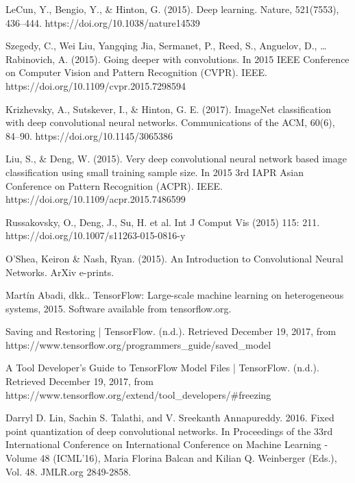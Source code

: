 %
% 

% 
% 
\begin{thebibliography}{4}

{LeCun, Y., Bengio, Y., \& Hinton, G. (2015). Deep learning. Nature, 521(7553), 436–444. https://doi.org/10.1038/nature14539}

{Szegedy, C., Wei Liu, Yangqing Jia, Sermanet, P., Reed, S., Anguelov, D., … Rabinovich, A. (2015). Going deeper with convolutions. In 2015 IEEE Conference on Computer Vision and Pattern Recognition (CVPR). IEEE. https://doi.org/10.1109/cvpr.2015.7298594}

{Krizhevsky, A., Sutskever, I., \& Hinton, G. E. (2017). ImageNet classification with deep convolutional neural networks. Communications of the ACM, 60(6), 84–90. https://doi.org/10.1145/3065386}

{Liu, S., \& Deng, W. (2015). Very deep convolutional neural network based image classification using small training sample size. In 2015 3rd IAPR Asian Conference on Pattern Recognition (ACPR). IEEE. https://doi.org/10.1109/acpr.2015.7486599}

{Russakovsky, O., Deng, J., Su, H. et al. Int J Comput Vis (2015) 115: 211. https://doi.org/10.1007/s11263-015-0816-y}

{O'Shea, Keiron \& Nash, Ryan. (2015). An Introduction to Convolutional Neural Networks. ArXiv e-prints.}

{Martín Abadi, dkk.. TensorFlow: Large-scale machine learning on heterogeneous systems, 2015. Software available from tensorflow.org.}

{Saving and Restoring  |  TensorFlow. (n.d.). Retrieved December 19, 2017, from https://www.tensorflow.org/programmers\_guide/saved\_model}

{A Tool Developer's Guide to TensorFlow Model Files  |  TensorFlow. (n.d.). Retrieved December 19, 2017, from https://www.tensorflow.org/extend/tool\_developers/\#freezing}

{Darryl D. Lin, Sachin S. Talathi, and V. Sreekanth Annapureddy. 2016. Fixed point quantization of deep convolutional networks. In Proceedings of the 33rd International Conference on International Conference on Machine Learning - Volume 48 (ICML'16), Maria Florina Balcan and Kilian Q. Weinberger (Eds.), Vol. 48. JMLR.org 2849-2858.}


\end{thebibliography}
